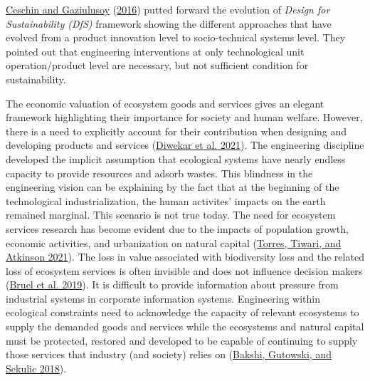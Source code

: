 \documentclass[
]{article}
\begin{document}
\protect\hyperlink{ref-Ceschin2016}{Ceschin and Gaziulusoy} (\protect\hyperlink{ref-Ceschin2016}{2016}) putted forward the evolution of \emph{Design for Sustainability (DfS)} framework showing the different approaches that have evolved from a product innovation level to socio-technical systems level.
They pointed out that engineering interventions at only technological unit operation/product level are necessary, but not sufficient condition for sustainability.

The economic valuation of ecosystem goods and services gives an elegant framework highlighting their importance for society and human welfare.
However, there is a need to explicitly account for their contribution when designing and developing products and services (\protect\hyperlink{ref-Diwekar2021}{Diwekar et al. 2021}).
The engineering discipline developed the implicit assumption that ecological systems have nearly endless capacity to provide resources and adsorb wastes.
This blindness in the engineering vision can be explaining by the fact that at the beginning of the technological industrialization, the human activites' impacts on the earth remained marginal. This scenario is not true today.
The need for ecosystem services research has become evident due to the impacts of population growth, economic activities, and urbanization on natural capital (\protect\hyperlink{ref-Torres2021}{Torres, Tiwari, and Atkinson 2021}).
The loss in value associated with biodiversity loss and the related loss of ecosystem services is often invisible and does not influence decision makers (\protect\hyperlink{ref-Bruel2018}{Bruel et al. 2019}).
It is difficult to provide information about pressure from industrial systems in corporate information systems.
Engineering within ecological constraints need to acknowledge the capacity of relevant ecosystems to supply the demanded goods and services while the ecosystems and natural capital must be protected, restored and developed to be capable of continuing to supply those services that industry (and society) relies on (\protect\hyperlink{ref-Bakshi2018}{Bakshi, Gutowski, and Sekulic 2018}).
\end{document}
